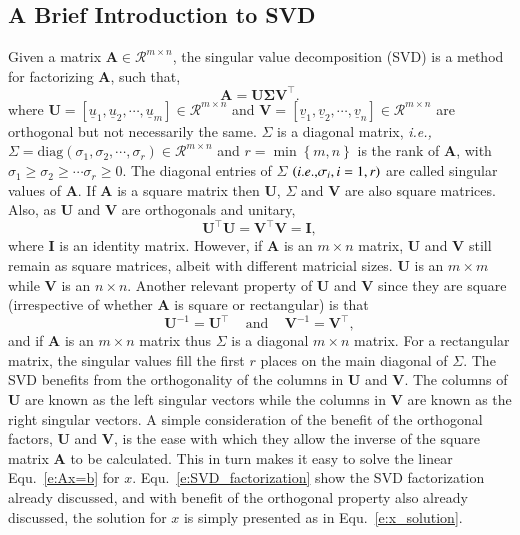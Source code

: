 \documentclass[preprint,12pt]{elsarticle}
\newcommand{\ie}{{\it i.e., }}
\begin{document}
\subsection{A Brief Introduction to SVD}\label{subsection:svd_brief}
Given a matrix $\mathbf{A}\in\mathcal{R}^{m\times n}$, the singular value decomposition (SVD) is a method for factorizing $\mathbf{A}$, such that,
\begin{equation}
  \mathbf{A} = \mathbf{U}\mathbf{\Sigma}\mathbf{V}^{\intercal}.
\end{equation}
where $\mathbf{U}=\left[\underline{u}_{1},\underline{u}_{2},\cdots,\underline{u}_{m}\right]\in\mathcal{R}^{m\times n}$ and $\mathbf{V}=\left[\underline{v}_{1},\underline{v}_{2},\cdots,\underline{v}_{n}\right]\in\mathcal{R}^{m\times n}$ are orthogonal but not necessarily the same. $\Sigma$ is a diagonal matrix, \ie $\Sigma=\text{diag}\left(\sigma_{1},\sigma_{2},\cdots,\sigma_{r}\right)\in\mathcal{R}^{m\times n}$ and $r=\min\left\{m,n\right\}$ is the rank of $\mathbf{A}$, with $\sigma_{1}\ge\sigma_{2}\ge\cdots\sigma_{r}\ge 0$. The diagonal entries of $\Sigma$ $\left(\ie \sigma_{i}, i=1,r\right)$ are called singular values of $\mathbf{A}$. If $\mathbf{A}$ is a square matrix then $\mathbf{U}$, $\Sigma$ and $\mathbf{V}$ are also square matrices. Also, as $\mathbf{U}$ and $\mathbf{V}$ are orthogonals and unitary, 
\begin{equation}
  \mathbf{U}^{\intercal}\mathbf{U} = \mathbf{V}^{\intercal}\mathbf{V} = \mathbf{I},
\end{equation}
where $\mathbf{I}$ is an identity matrix. However, if $\mathbf{A}$ is an $m\times n$ matrix, $\mathbf{U}$ and $\mathbf{V}$ still remain as square matrices, albeit with different matricial sizes. $\mathbf{U}$ is an $m\times m$ while $\mathbf{V}$ is an $n\times n$. Another relevant property of $\mathbf{U}$ and $\mathbf{V}$ since they are square (irrespective of whether $\mathbf{A}$ is square or rectangular) is that
\begin{equation}
  \mathbf{U}^{-1} = \mathbf{U}^{\intercal} \;\;\;\text{ and }\;\;\; \mathbf{V}^{-1} = \mathbf{V}^{\intercal},
\end{equation}
and if $\mathbf{A}$ is an $m \times n$ matrix thus $\Sigma$ is a diagonal $m \times n$ matrix. For a rectangular matrix, the singular values fill the first $r$ places on the main diagonal of $\Sigma$. The SVD benefits from the orthogonality of the columns in $\mathbf{U}$ and $\mathbf{V}$. The columns of $\mathbf{U}$ are known as the left singular vectors while the columns in $\mathbf{V}$ are known as the right singular vectors. A simple consideration of the benefit of the orthogonal factors, $\mathbf{U}$ and $\mathbf{V}$, is the ease with which they allow the inverse of the square matrix $\mathbf{A}$ to be calculated. This in turn makes it easy to solve the linear Equ.~\ref{e:Ax=b} for $x$. Equ.~\ref{e:SVD_factorization} show the SVD factorization already discussed, and with benefit of the orthogonal property also already discussed, the solution for $x$ is simply presented as in Equ.~\ref{e:x_solution}.
\end{document}

